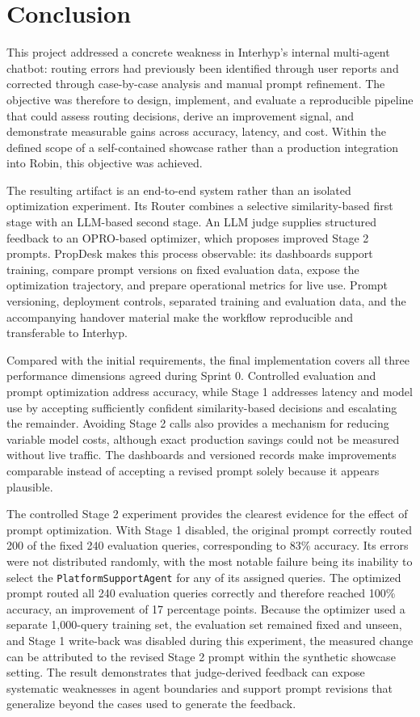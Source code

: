 \clearreportauthor
\section{Conclusion}\label{sec:conclusion}

This project addressed a concrete weakness in Interhyp's internal multi-agent chatbot: routing errors had previously been identified through user reports and corrected through case-by-case analysis and manual prompt refinement. The objective was therefore to design, implement, and evaluate a reproducible pipeline that could assess routing decisions, derive an improvement signal, and demonstrate measurable gains across accuracy, latency, and cost. Within the defined scope of a self-contained showcase rather than a production integration into Robin, this objective was achieved.

The resulting artifact is an end-to-end system rather than an isolated optimization experiment. Its Router combines a selective similarity-based first stage with an LLM-based second stage. An LLM judge supplies structured feedback to an OPRO-based optimizer, which proposes improved Stage 2 prompts. PropDesk makes this process observable: its dashboards support training, compare prompt versions on fixed evaluation data, expose the optimization trajectory, and prepare operational metrics for live use. Prompt versioning, deployment controls, separated training and evaluation data, and the accompanying handover material make the workflow reproducible and transferable to Interhyp.

Compared with the initial requirements, the final implementation covers all three performance dimensions agreed during Sprint 0. Controlled evaluation and prompt optimization address accuracy, while Stage 1 addresses latency and model use by accepting sufficiently confident similarity-based decisions and escalating the remainder. Avoiding Stage 2 calls also provides a mechanism for reducing variable model costs, although exact production savings could not be measured without live traffic. The dashboards and versioned records make improvements comparable instead of accepting a revised prompt solely because it appears plausible.

The controlled Stage 2 experiment provides the clearest evidence for the effect of prompt optimization. With Stage 1 disabled, the original prompt correctly routed 200 of the fixed 240 evaluation queries, corresponding to 83\% accuracy. Its errors were not distributed randomly, with the most notable failure being its inability to select the \texttt{PlatformSupportAgent} for any of its assigned queries. The optimized prompt routed all 240 evaluation queries correctly and therefore reached 100\% accuracy, an improvement of 17 percentage points. Because the optimizer used a separate 1,000-query training set, the evaluation set remained fixed and unseen, and Stage 1 write-back was disabled during this experiment, the measured change can be attributed to the revised Stage 2 prompt within the synthetic showcase setting. The result demonstrates that judge-derived feedback can expose systematic weaknesses in agent boundaries and support prompt revisions that generalize beyond the cases used to generate the feedback.


